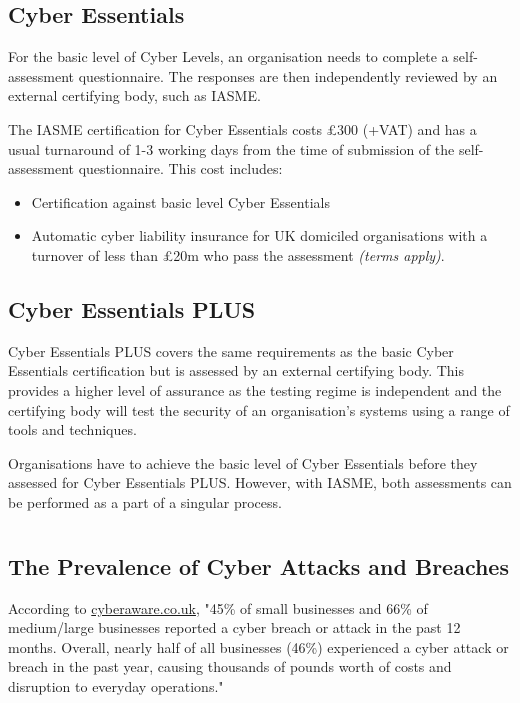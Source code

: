 \documentclass[12pt]{article}
\begin{document}
\subsection*{Cyber Essentials}
For the basic level of Cyber Levels, an organisation needs to complete a self-assessment questionnaire. The responses are then independently reviewed by an external certifying body, such as IASME.

The IASME certification for Cyber Essentials costs £300 (+VAT) and has a usual turnaround of 1-3 working days from the time of submission of the self-assessment questionnaire. This cost includes:
\begin{itemize}
  \item Certification against basic level Cyber Essentials
  \item Automatic cyber liability insurance for UK domiciled organisations with a\\turnover of less than £20m who pass the assessment \textit{(terms apply)}.
\end{itemize}

\subsection*{Cyber Essentials PLUS}
Cyber Essentials PLUS covers the same requirements as the basic Cyber Essentials certification but is assessed by an external certifying body. This provides a higher level of assurance as the testing regime is independent and the certifying body will test the security of an organisation's systems using a range of tools and techniques.

Organisations have to achieve the basic level of Cyber Essentials before they assessed for Cyber Essentials PLUS. However, with IASME, both assessments can be performed as a part of a singular process.


\section*{}
\subsection*{The Prevalence of Cyber Attacks and Breaches}
According to \href{https://www.cyberaware.gov.uk/cyberessentials/faq.html}{cyberaware.co.uk}, "45\% of small businesses and 66\% of medium/large businesses reported a cyber breach or attack in the past 12 months. Overall, nearly half of all businesses (46\%) experienced a cyber attack or breach in the past year, causing thousands of pounds worth of costs and disruption to everyday operations."
\end{document}
